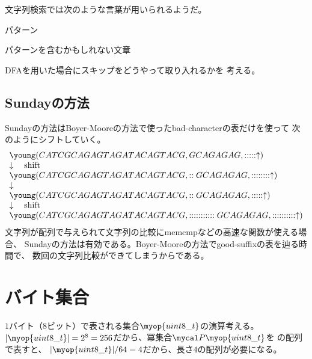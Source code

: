 {	\begin{note}[文字列検索での言葉]\label{note:文字列検索での言葉} %
		文字列検索では次のような言葉が用いられるようだ。
		\begin{description}\setlength{\itemsep}{-1mm} %
			\item[needle] パターン
			\item[haystack] パターンを含むかもしれない文章
		\end{description} %
	\end{note} %
	\begin{todo}[やりたいこと]\label{todo:やりたいこと} %
		\begin{description}\setlength{\itemsep}{-1mm} %
			\item[DFA] DFAを用いた場合にスキップをどうやって取り入れるかを
			考える。
		\end{description} %
	\end{todo} %
\subsection{Sundayの方法}\label{s2:Sundayの方法} %
	Sundayの方法はBoyer-Mooreの方法で使ったbad-characterの表だけを使って
	次のようにシフトしていく。
	\begin{equation*}\begin{array}{l}
		\young(CATCGCAGAGTAGATACAGTACG,GCAGAGAG,:::::\uparrow) \\
		\downarrow \quad\text{shift} \\
		\young(CATCGCAGAGTAGATACAGTACG,::GCAGAGAG,::::::::\uparrow) \\
		\downarrow \\
		\young(CATCGCAGAGTAGATACAGTACG,::GCAGAGAG,:::::\uparrow) \\
		\downarrow \quad\text{shift} \\
		\young(CATCGCAGAGTAGATACAGTACG,:::::::::::GCAGAGAG,::::::::::\uparrow) \\
	\end{array}\end{equation*}
	文字列が配列で与えられて文字列の比較にmemcmpなどの高速な関数が使える場合、
	Sundayの方法は有効である。Boyer-Mooreの方法でgood-suffixの表を辿る時間で、
	数回の文字列比較ができてしまうからである。
\section{バイト集合}\label{s1:バイト集合} %
	$1$バイト（$8$ビット）で表される集合$\myop{uint8\_t}$の演算考える。
	$|\myop{uint8\_t}|=2^8=256$だから、冪集合$\Pow\myop{uint8\_t}$を
	の配列で表すと、
	$|\myop{uint8\_t}|/64=4$だから、長さ$4$の配列が必要になる。

}
